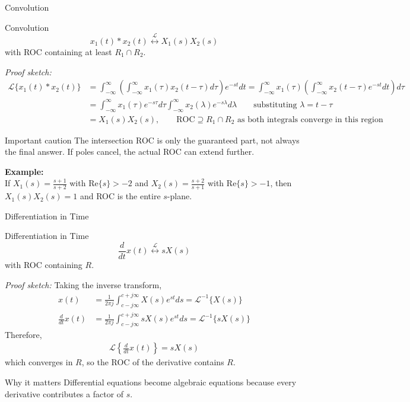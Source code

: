 \begin{frame}[t]{Convolution}
  \footnotesize
  \begin{conceptbox}{Convolution}
    \[
      x_1(t)*x_2(t)
      \stackrel{\mathcal{L}}{\longleftrightarrow}
      X_1(s)X_2(s)
    \]
    with ROC containing at least $R_1\cap R_2$.
  \end{conceptbox}

  \textit{Proof sketch:}
  \begin{align*}
    \mathcal{L}\{x_1(t)*x_2(t)\}
    & = \int_{-\infty}^{\infty} \left(\int_{-\infty}^{\infty} x_1(\tau) x_2(t-\tau) d\tau\right) e^{-st} dt
    = \int_{-\infty}^{\infty} x_1(\tau) \left(\int_{-\infty}^{\infty} x_2(t-\tau) e^{-st} dt\right) d\tau \\
    & = \int_{-\infty}^{\infty} x_1(\tau) e^{-s\tau} d\tau \int_{-\infty}^{\infty} x_2(\lambda) e^{-s\lambda} d\lambda \qquad \text{substituting } \lambda = t - \tau \\
    & = X_1(s) X_2(s), \qquad \text{ROC} \supseteq R_1 \cap R_2 \text{ as both integrals converge in this region}
  \end{align*}

  \begin{insightbox}{Important caution}
    The intersection ROC is only the guaranteed part, not always the final answer.
    If poles cancel, the actual ROC can extend further.
  \end{insightbox}

  \textbf{Example:}\\
  If $X_1(s)=\frac{s+1}{s+2}$ with $\text{Re}\{s\}>-2$ and $X_2(s)=\frac{s+2}{s+1}$
  with $\text{Re}\{s\}>-1$, then $X_1(s)X_2(s)=1$ and ROC is the entire $s$-plane.
\end{frame}

\begin{frame}[t]{Differentiation in Time}
  \footnotesize
  \begin{conceptbox}{Differentiation in Time}
    \[
      \frac{d}{dt}x(t)
      \stackrel{\mathcal{L}}{\longleftrightarrow}
      sX(s)
    \]
    with ROC containing $R$.
  \end{conceptbox}

  \textit{Proof sketch:} Taking the inverse transform,
  \begin{align*}
    x(t) & = \frac{1}{2\pi j} \int_{c-j\infty}^{c+j\infty} X(s) e^{st} ds = \mathcal{L}^{-1}\{X(s)\} \\
    \frac{d}{dt}x(t) & = \frac{1}{2\pi j} \int_{c-j\infty}^{c+j\infty} s X(s) e^{st} ds = \mathcal{L}^{-1}\{sX(s)\}
  \end{align*}
  Therefore,
  \begin{align*}
    \mathcal{L}\left\{\frac{d}{dt}x(t)\right\} = sX(s)
  \end{align*}
  which converges in $R$, so the ROC of the derivative contains $R$.
  \begin{insightbox}{Why it matters}
    Differential equations become algebraic equations because every derivative contributes a factor of $s$.
  \end{insightbox}
\end{frame}

